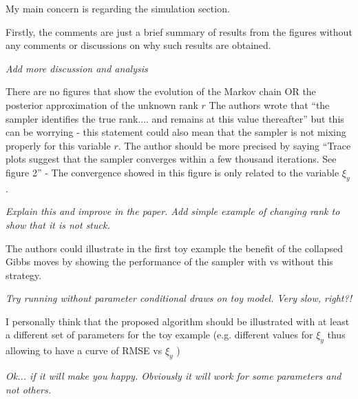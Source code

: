 \documentclass{article}
\newenvironment{review}[0]{\begin{itshape}\color{Gray}\noindent}{\end{itshape}\vspace{0.4cm}}
\newenvironment{response}[0]{\noindent}{\vspace{0.4cm}}
\newcommand{\meta}[1]{{\color{red}\em #1}}
\begin{document}
\begin{review}
My main concern is regarding the simulation section.

Firstly, the comments are just a brief summary of results from the figures without any comments or discussions on why such results are obtained.
\end{review}

\begin{response}
 \meta{Add more discussion and analysis}
\end{response}

\begin{review}
There are no figures that show the evolution of the Markov chain OR the posterior approximation of the unknown rank $r$
The authors wrote that ``the sampler identifies the true rank.... and remains at this value thereafter'' but this can be worrying - this statement could also mean that the sampler is not mixing properly for this variable $r$. The author should be more precised by saying ``Trace plots suggest that the sampler converges within a few thousand iterations. See figure 2'' - The convergence showed in this figure is only related to the variable $\xi_y$.
\end{review}

\begin{response}
 \meta{Explain this and improve in the paper. Add simple example of changing rank to show that it is not stuck.}
\end{response}

\begin{review}
The authors could illustrate in the first toy example the benefit of the collapsed Gibbs
moves by showing the performance of the sampler with vs without this strategy.
\end{review}

\begin{response}
 \meta{Try running without parameter conditional draws on toy model. Very slow, right?!}
\end{response}

\begin{review}
I personally think that the proposed algorithm should be illustrated with at least a different set of parameters for the toy example (e.g. different values for $\xi_y$ thus allowing to have a curve of RMSE vs $\xi_y$ )
\end{review}

\begin{response}
 \meta{Ok... if it will make you happy. Obviously it will work for some parameters and not others.}
\end{response}
\end{document}
